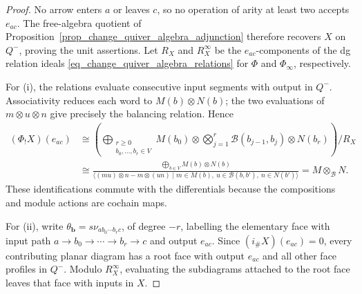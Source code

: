 \documentclass[11pt,letterpaper]{article}
\numberwithin{equation}{section}
\theoremstyle{plain}
\theoremstyle{definition}
\theoremstyle{remark}
\begin{document}
\begin{proof}
No arrow enters $a$ or leaves $c$, so no operation of arity at
least two accepts $e_{ac}$. The free-algebra quotient of
Proposition~\ref{prop_change_quiver_algebra_adjunction} therefore
recovers $X$ on $Q^-$, proving the unit assertions.
Let $R_X$ and $R_X^\infty$ be the $e_{ac}$-components of the dg
relation ideals \eqref{eq_change_quiver_algebra_relations}
for $\Phi$ and $\Phi_\infty$, respectively.

For (i), the relations evaluate consecutive input segments with
output in $Q^-$. Associativity reduces each word to $M(b)\otimes N(b)$;
the two evaluations of $m\otimes u\otimes n$ give precisely the
balancing relation. Hence
\begin{align*}
 (\Phi_!X)(e_{ac})
 &\cong
 \left(\bigoplus_{\substack{r\ge0\\b_0,\ldots,b_r\in V}}
 M(b_0)\otimes\bigotimes_{j=1}^r\mathcal B(b_{j-1},b_j)
 \otimes N(b_r)\right)\bigg/R_X\\
 &\cong
 \frac{\displaystyle\bigoplus_{b\in V}M(b)\otimes N(b)}
 {\bigl\langle (m u)\otimes n-m\otimes(u n)
 \mid m\in M(b),\ u\in\mathcal B(b,b'),\ n\in N(b')\bigr\rangle} =M\otimes_{\mathcal B}N.
\end{align*}
These identifications commute with the differentials because
the compositions and module actions are cochain maps.

For (ii), write $\theta_{\mathbf b}=s\nu_{a b_0\cdots b_r c}$,
of degree $-r$, labelling the elementary face with input path
$a\to b_0\to\cdots\to b_r\to c$ and output $e_{ac}$.
Since $(i_\#X)(e_{ac})=0$, every contributing planar diagram
has a root face with output $e_{ac}$ and all other face profiles in $Q^-$.
Modulo $R_X^\infty$, evaluating the subdiagrams attached to the
root face leaves that face with inputs in $X$.


\end{proof}
\end{document}
